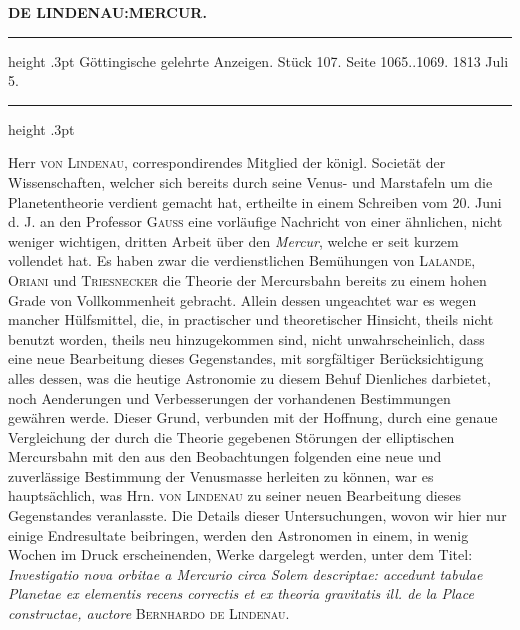 \clearpage
\thispagestyle{empty}
\noindent{}%
\makebox[12mm][l]{}%
\parbox[t]{\dimexpr\linewidth-24mm\relax}{\centering\footnotesize\bfseries DE LINDENAU:\enspace MERCUR.\par}%
\par\nobreak\medskip
\begin{center}
\parbox{.80\linewidth}{%
\centering\small
\hrule height .3pt\relax\vspace{2.5pt}
Göttingische gelehrte Anzeigen. Stück 107. Seite 1065..1069. 1813 Juli 5.\par
\vspace{2.5pt}\hrule height .3pt\relax
}
\end{center}

Herr \textsc{von Lindenau}, correspondirendes Mitglied der königl. Societät der Wissenschaften, welcher sich bereits durch seine Venus- und Marstafeln um die Planetentheorie verdient gemacht hat, ertheilte in einem Schreiben vom 20. Juni d. J. an den Professor \textsc{Gauss} eine vorläufige Nachricht von einer ähnlichen, nicht weniger wichtigen, dritten Arbeit über den \emph{Mercur}, welche er seit kurzem vollendet hat. Es haben zwar die verdienstlichen Bemühungen von \textsc{Lalande}, \textsc{Oriani} und \textsc{Triesnecker} die Theorie der Mercursbahn bereits zu einem hohen Grade von Vollkommenheit gebracht. Allein dessen ungeachtet war es wegen mancher Hülfsmittel, die, in practischer und theoretischer Hinsicht, theils nicht benutzt worden, theils neu hinzugekommen sind, nicht unwahrscheinlich, dass eine neue Bearbeitung dieses Gegenstandes, mit sorgfältiger Berücksichtigung alles dessen, was die heutige Astronomie zu diesem Behuf Dienliches darbietet, noch Aenderungen und Verbesserungen der vorhandenen Bestimmungen gewähren werde. Dieser Grund, verbunden mit der Hoffnung, durch eine genaue Vergleichung der durch die Theorie gegebenen Störungen der elliptischen Mercursbahn mit den aus den Beobachtungen folgenden eine neue und zuverlässige Bestimmung der Venusmasse herleiten zu können, war es hauptsächlich, was Hrn. \textsc{von Lindenau} zu seiner neuen Bearbeitung dieses Gegenstandes veranlasste. Die Details dieser Untersuchungen, wovon wir hier nur einige Endresultate beibringen, werden den Astronomen in einem, in wenig Wochen im Druck erscheinenden, Werke dargelegt werden, unter dem Titel: \emph{Investigatio nova orbitae a Mercurio circa Solem descriptae: accedunt tabulae Planetae ex elementis recens correctis et ex theoria gravitatis ill. de la Place constructae, auctore} \textsc{Bernhardo de Lindenau}.

